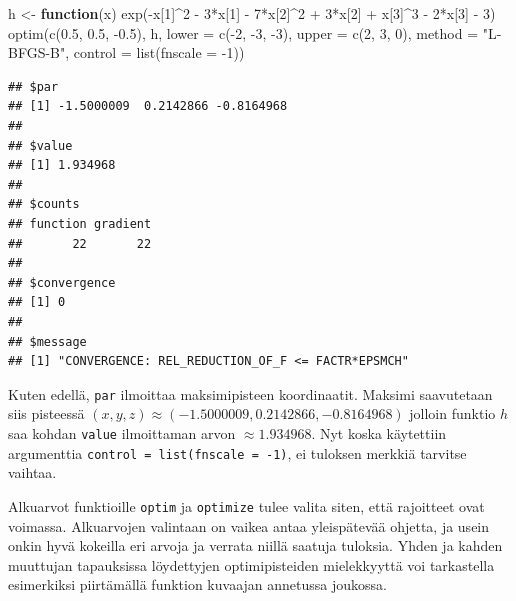 \documentclass[
]{book}
\newenvironment{Shaded}{\begin{snugshade}}{\end{snugshade}}
\newcommand{\AttributeTok}[1]{\textcolor[rgb]{0.77,0.63,0.00}{#1}}
\newcommand{\ControlFlowTok}[1]{\textcolor[rgb]{0.13,0.29,0.53}{\textbf{#1}}}
\newcommand{\DecValTok}[1]{\textcolor[rgb]{0.00,0.00,0.81}{#1}}
\newcommand{\FloatTok}[1]{\textcolor[rgb]{0.00,0.00,0.81}{#1}}
\newcommand{\FunctionTok}[1]{\textcolor[rgb]{0.00,0.00,0.00}{#1}}
\newcommand{\NormalTok}[1]{#1}
\newcommand{\OtherTok}[1]{\textcolor[rgb]{0.56,0.35,0.01}{#1}}
\newcommand{\SpecialCharTok}[1]{\textcolor[rgb]{0.00,0.00,0.00}{#1}}
\newcommand{\StringTok}[1]{\textcolor[rgb]{0.31,0.60,0.02}{#1}}
\begin{document}
\begin{Shaded}
\begin{Highlighting}[]
\NormalTok{h }\OtherTok{\textless{}{-}} \ControlFlowTok{function}\NormalTok{(x) }\FunctionTok{exp}\NormalTok{(}\SpecialCharTok{{-}}\NormalTok{x[}\DecValTok{1}\NormalTok{]}\SpecialCharTok{\^{}}\DecValTok{2} \SpecialCharTok{{-}} \DecValTok{3}\SpecialCharTok{*}\NormalTok{x[}\DecValTok{1}\NormalTok{] }\SpecialCharTok{{-}} \DecValTok{7}\SpecialCharTok{*}\NormalTok{x[}\DecValTok{2}\NormalTok{]}\SpecialCharTok{\^{}}\DecValTok{2} \SpecialCharTok{+} \DecValTok{3}\SpecialCharTok{*}\NormalTok{x[}\DecValTok{2}\NormalTok{] }\SpecialCharTok{+}\NormalTok{ x[}\DecValTok{3}\NormalTok{]}\SpecialCharTok{\^{}}\DecValTok{3} \SpecialCharTok{{-}} \DecValTok{2}\SpecialCharTok{*}\NormalTok{x[}\DecValTok{3}\NormalTok{] }\SpecialCharTok{{-}} \DecValTok{3}\NormalTok{)}
\FunctionTok{optim}\NormalTok{(}\FunctionTok{c}\NormalTok{(}\FloatTok{0.5}\NormalTok{, }\FloatTok{0.5}\NormalTok{, }\SpecialCharTok{{-}}\FloatTok{0.5}\NormalTok{), h, }\AttributeTok{lower =} \FunctionTok{c}\NormalTok{(}\SpecialCharTok{{-}}\DecValTok{2}\NormalTok{, }\SpecialCharTok{{-}}\DecValTok{3}\NormalTok{, }\SpecialCharTok{{-}}\DecValTok{3}\NormalTok{), }\AttributeTok{upper =} \FunctionTok{c}\NormalTok{(}\DecValTok{2}\NormalTok{, }\DecValTok{3}\NormalTok{, }\DecValTok{0}\NormalTok{), }
      \AttributeTok{method =} \StringTok{"L{-}BFGS{-}B"}\NormalTok{, }\AttributeTok{control =} \FunctionTok{list}\NormalTok{(}\AttributeTok{fnscale =} \SpecialCharTok{{-}}\DecValTok{1}\NormalTok{))}
\end{Highlighting}
\end{Shaded}

\begin{verbatim}
## $par
## [1] -1.5000009  0.2142866 -0.8164968
## 
## $value
## [1] 1.934968
## 
## $counts
## function gradient 
##       22       22 
## 
## $convergence
## [1] 0
## 
## $message
## [1] "CONVERGENCE: REL_REDUCTION_OF_F <= FACTR*EPSMCH"
\end{verbatim}

Kuten edellä, \texttt{par} ilmoittaa maksimipisteen koordinaatit. Maksimi saavutetaan siis pisteessä \((x,y,z) \approx (-1.5000009, 0.2142866, -0.8164968)\) jolloin funktio \(h\) saa kohdan \texttt{value} ilmoittaman arvon \(\approx 1.934968\). Nyt koska käytettiin argumenttia \texttt{control\ =\ list(fnscale\ =\ -1)}, ei tuloksen merkkiä tarvitse vaihtaa.

Alkuarvot funktioille \texttt{optim} ja \texttt{optimize} tulee valita siten, että rajoitteet ovat voimassa. Alkuarvojen valintaan on vaikea antaa yleispätevää ohjetta, ja usein onkin hyvä kokeilla eri arvoja ja verrata niillä saatuja tuloksia. Yhden ja kahden muuttujan tapauksissa löydettyjen optimipisteiden mielekkyyttä voi tarkastella esimerkiksi piirtämällä funktion kuvaajan annetussa joukossa.
\end{document}
